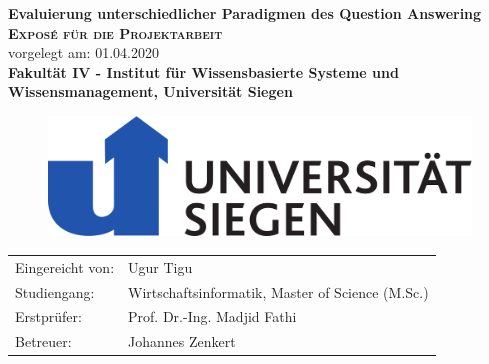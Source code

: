 \documentclass[
        ngerman,
        paper=a4,
        numbers=noendperiod,
]{scrreprt}
\begin{document}
\begin{titlepage}
    \begin{center}
    \huge \textbf{\textsf{Evaluierung unterschiedlicher Paradigmen des Question Answering}} \\
    \vspace{1cm}
    \LARGE\textbf{\textsc{Exposé für die Projektarbeit }}\\
    \vspace{1cm}
    \normalsize
    vorgelegt am: 01.04.2020\\
    \vspace{2.5cm}
    \large \textbf{Fakultät IV - 
Institut für Wissensbasierte
Systeme und Wissensmanagement, Universität Siegen
}
\linebreak
\linebreak
\begin{figure}[H]
    \centering\includegraphics[width=0.4\linewidth]{images/imageuni.pdf}
    \label{fig:Unilabel}
\end{figure}
    \end{center}
    \vspace{3cm}
    \begin{center}
 \normalsize{
    \begin{tabular}{ll}
    	Eingereicht von: & {Ugur Tigu} \\
    	Studiengang: & Wirtschaftsinformatik, Master of Science (M.Sc.)\\
	Erstprüfer: & Prof. Dr.-Ing. Madjid Fathi \\
	Betreuer: &   Johannes Zenkert\\
    \end{tabular}\\
    }
\end{center}
\end{titlepage}
\setcounter{page}{0}
\tableofcontents
\clearpage 
{}
\listoffigures
\clearpage 
{}
\listoftables
\clearpage 
\end{document}
